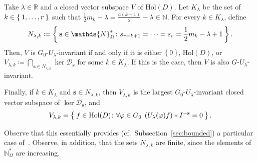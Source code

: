 \documentclass[10.5pt,reqno]{amsart}
\newcommand{\Hol}{\mathrm{Hol}}
\newcommand{\vect}[1]{\mathbf{{#1}}}
\newcommand{\N}{\mathds{N}}
\newcommand{\R}{\mathds{R}}
\newcommand{\Dc}{\mathcal{D}}
\renewcommand{\phi}{\varphi}
\begin{document}
\begin{prop}\label{prop:12}
	Take $\lambda\in \R$ and a closed vector subspace $V$ of $\Hol(D)$.  Let $K_\lambda$ be the set of $k\in\Set{1,\dots,r}$ such that  $ \frac 1 2 m_{k}-\lambda=\frac{a(k-1) }{2}-\lambda\in\N$. 
	For every $k\in K_\lambda$, define 
	\[
	N_{\lambda,k}\coloneqq\Set{\vect s\in \N^*_\Omega\colon	s_{ r-k+1}=\cdots=s_{ r}=\frac 1 2 m_k-\lambda+1 }.
	\]
	Then, $V$ is $G_0$-$U_\lambda$-invariant if and only if it is either $\Set{0}$, $\Hol(D)$, or $V_{\lambda,k}\coloneqq \bigcap_{\vect s\in N_{\lambda,k}}\ker \Dc_{\vect s}$ for some $k\in K_\lambda$.
	If this is the case, then $V$ is also $G$-$U_\lambda$-invariant.
	
	Finally, if $k\in K_\lambda$ and $\vect s\in N_{\lambda,k}$, then $V_{\lambda,k} $ is the largest $G_0$-$U_\lambda$-invariant closed vector subspace of $\ker \Dc_{\vect s}$, and
	\[
	V_{\lambda,k}=\Set{f\in \Hol(D)\colon \forall \phi\in G_0\:\: (U_\lambda(\phi) f)*I^{-\vect s}=0  }.
	\]
\end{prop}

Observe that this essentially provides (cf.~Subsection~\ref{sec:bounded}) a particular case of~\cite[Theorem 4.8, (ii)]{Arazy}.
Observe, in addition, that the sets $N_{\lambda,k}$ are finite, since the elements of $\N^*_\Omega$ are increasing.  
\end{document}

